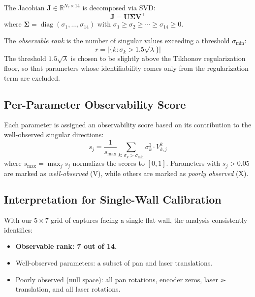 \documentclass[12pt,a4paper]{article}
\DeclareMathOperator{\diag}{diag}
\newcommand{\R}{\mathbb{R}}
\begin{document}
The Jacobian $\mathbf{J} \in \R^{N_r \times 14}$ is decomposed via SVD:
\begin{equation}
    \mathbf{J} = \mathbf{U} \bm{\Sigma} \mathbf{V}^\top
    \label{eq:svd}
\end{equation}
where $\bm{\Sigma} = \diag(\sigma_1, \ldots, \sigma_{14})$ with
$\sigma_1 \ge \sigma_2 \ge \cdots \ge \sigma_{14} \ge 0$.

The \emph{observable rank} is the number of singular values exceeding a
threshold $\sigma_{\min}$:
\begin{equation}
    r = \bigl|\{k : \sigma_k > 1.5\sqrt{\lambda}\}\bigr|
    \label{eq:obs_rank}
\end{equation}
The threshold $1.5\sqrt{\lambda}$ is chosen to be slightly above the
Tikhonov regularization floor, so that parameters whose identifiability
comes only from the regularization term are excluded.

\subsection{Per-Parameter Observability Score}

Each parameter is assigned an observability score based on its
contribution to the well-observed singular directions:
\begin{equation}
    s_j = \frac{1}{s_{\max}} \sum_{k:\, \sigma_k > \sigma_{\min}}
    \sigma_k^2 \cdot V_{k,j}^2
    \label{eq:obs_score}
\end{equation}
where $s_{\max} = \max_j s_j$ normalizes the scores to $[0, 1]$.
Parameters with $s_j > 0.05$ are marked as \emph{well-observed} (V),
while others are marked as \emph{poorly observed} (X).

\subsection{Interpretation for Single-Wall Calibration}

With our $5 \times 7$ grid of captures facing a single flat wall,
the analysis consistently identifies:
\begin{itemize}[nosep]
    \item \textbf{Observable rank: 7 out of 14.}
    \item Well-observed parameters: a subset of pan and laser translations.
    \item Poorly observed (null space): all pan rotations, encoder zeros,
          laser $z$-translation, and all laser rotations.
\end{itemize}
\end{document}
